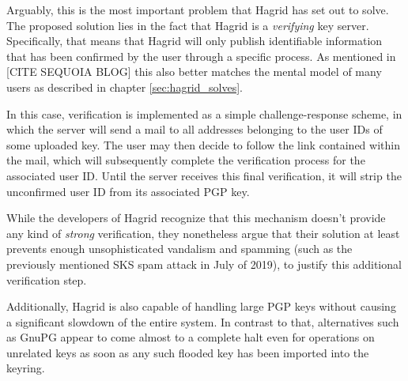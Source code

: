 Arguably, this is the most important problem that Hagrid has set out to solve. The proposed solution lies in the fact that Hagrid is a \emph{verifying} key server. Specifically, that means that Hagrid will only publish identifiable information that has been confirmed by the user through a specific process. As mentioned in [CITE SEQUOIA BLOG] this also better matches the mental model of many users as described in chapter \ref{sec:hagrid_solves}.

In this case, verification is implemented as a simple challenge-response scheme, in which the server will send a mail to all addresses belonging to the user IDs of some uploaded key. The user may then decide to follow the link contained within the mail, which will subsequently complete the verification process for the associated user ID.
Until the server receives this final verification, it will strip the unconfirmed user ID from its associated PGP key.

While the developers of Hagrid recognize that this mechanism doesn't provide any kind of \emph{strong} verification, they nonetheless argue that their solution at least prevents enough unsophisticated vandalism and spamming (such as the previously mentioned SKS spam attack in July of 2019), to justify this additional verification step.

Additionally, Hagrid is also capable of handling large PGP keys without causing a significant slowdown of the entire system. In contrast to that, alternatives such  as GnuPG appear to come almost to a complete halt even for operations on unrelated keys as soon as any such flooded key has been imported into the keyring. 
